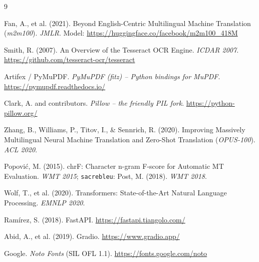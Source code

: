 \documentclass[12pt,a4paper]{article}
\begin{document}
\newpage
\begin{thebibliography}{9}

 Fan, A., et al. (2021). Beyond English-Centric Multilingual Machine Translation (\textit{m2m100}). \textit{JMLR}. Model: \url{https://huggingface.co/facebook/m2m100_418M}

 Smith, R. (2007). An Overview of the Tesseract OCR Engine. \textit{ICDAR 2007}. \url{https://github.com/tesseract-ocr/tesseract}

 Artifex / PyMuPDF. \textit{PyMuPDF (fitz) -- Python bindings for MuPDF}. \url{https://pymupdf.readthedocs.io/}

 Clark, A. and contributors. \textit{Pillow -- the friendly PIL fork}. \url{https://python-pillow.org/}

 Zhang, B., Williams, P., Titov, I., \& Sennrich, R. (2020). Improving Massively Multilingual Neural Machine Translation and Zero-Shot Translation (\textit{OPUS-100}). \textit{ACL 2020}.

 Popovi\'c, M. (2015). chrF: Character n-gram F-score for Automatic MT Evaluation. \textit{WMT 2015}; \texttt{sacrebleu}: Post, M. (2018). \textit{WMT 2018}.

 Wolf, T., et al. (2020). Transformers: State-of-the-Art Natural Language Processing. \textit{EMNLP 2020}.

 Ram\'irez, S. (2018). FastAPI. \url{https://fastapi.tiangolo.com/}

 Abid, A., et al. (2019). Gradio. \url{https://www.gradio.app/}

 Google. \textit{Noto Fonts} (SIL OFL 1.1). \url{https://fonts.google.com/noto}

\end{thebibliography}
\end{document}

